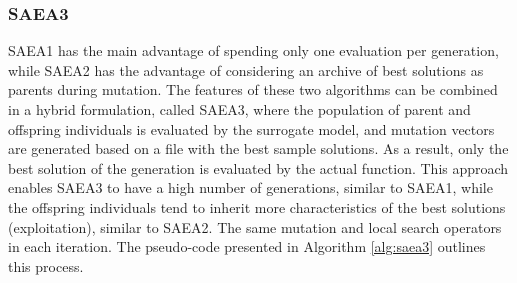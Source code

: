 			\subsubsection{SAEA3}\label{chap:proposed-methodology:surrogate:algorithms:saea3}
			
				SAEA1 has the main advantage of spending only one evaluation per generation, while SAEA2 has the advantage of considering an archive of best solutions as parents during mutation. The features of these two algorithms can be combined in a hybrid formulation, called SAEA3, where the population of parent and offspring individuals is evaluated by the surrogate model, and mutation vectors are generated based on a file with the best sample solutions. As a result, only the best solution of the generation is evaluated by the actual function. This approach enables SAEA3 to have a high number of generations, similar to SAEA1, while the offspring individuals tend to inherit more characteristics of the best solutions (exploitation), similar to SAEA2. The same mutation and local search operators in each iteration. The pseudo-code presented in Algorithm \ref{alg:saea3} outlines this process.
				
